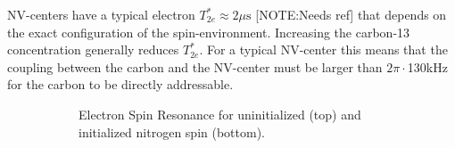 NV-centers have a typical electron $T_{2e}^* \approx 2\mu \mathrm{s}$ [NOTE:Needs ref] that depends on the exact configuration of the spin-environment. Increasing the carbon-13 concentration generally reduces $T_{2e}^*$. For a typical NV-center this means that the coupling between the carbon and the NV-center must be larger than $2\pi\cdot$130kHz for the carbon to be directly addressable.
\begin{figure}[htbp]
\centering
    \begin{subfigure}[t]{0.49 \textwidth}\centering
        \caption{Electron Spin Resonance for uninitialized (top) and initialized nitrogen spin (bottom).}
        \label{fig:HF_split_levels}
    \end{subfigure}
    \begin{subfigure}[t]{0.49 \textwidth }\centering
\end{subfigure}
\end{figure}
